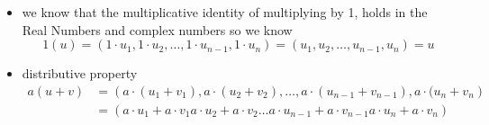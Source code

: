 \documentclass[11pt]{book}
\begin{document}
\begin{ver}
\begin{itemize}
\[            \]
        \item we know that the multiplicative identity of multiplying by 1, holds in the Real Numbers and complex numbers so we know 
            \[
                1\left( u \right) = \left( 1 \cdot u_{1} , 1 \cdot u_{2} , \dotsc  , 1 \cdot u_{n - 1} , 1 \cdot u_{n}  \right) = \left( u_{1} , u_{2} , \dotsc  , u_{n - 1} , u_{n}  \right) = u
            \]
        \item distributive property 
            \begin{align*}
                a\left( u + v \right) &=  \left( a \cdot (u_{1} + v_{1} ), a \cdot (u_{2} + v_{2} ), \dotsc  , a \cdot (u_{n - 1} + v_{n - 1} ), a \cdot (u_{n} + v_{n}  \right) \\
                                      &= \left( a \cdot u_{1} + a \cdot v_{1}  a \cdot u_{2} + a \cdot v_{2}  \dotsc   a \cdot u_{n - 1} + a \cdot v_{n - 1}  a \cdot u_{n} + a \cdot v_{n}  \right)   \\ 
            \end{align*}
    \end{itemize}
\end{ver}




\end{document}
